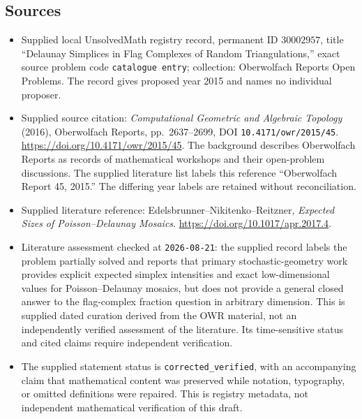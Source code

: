 \documentclass[11pt]{article}
\begin{document}
\subsection{Sources}
\begin{itemize}
\item Supplied local UnsolvedMath registry record, permanent ID \(30002957\), title ``Delaunay Simplices in Flag Complexes of Random Triangulations,'' exact source problem code \texttt{catalogue entry}; collection: Oberwolfach Reports Open Problems. The record gives proposed year 2015 and names no individual proposer.
\item Supplied source citation: \emph{Computational Geometric and Algebraic Topology} (2016), Oberwolfach Reports, pp.\ 2637--2699, DOI \texttt{10.4171/owr/2015/45}. \url{https://doi.org/10.4171/owr/2015/45}. The background describes Oberwolfach Reports as records of mathematical workshops and their open-problem discussions. The supplied literature list labels this reference ``Oberwolfach Report 45, 2015.'' The differing year labels are retained without reconciliation.
\item Supplied literature reference: Edelsbrunner--Nikitenko--Reitzner, \emph{Expected Sizes of Poisson--Delaunay Mosaics}. \url{https://doi.org/10.1017/apr.2017.4}.
\item Literature assessment checked at \texttt{2026-08-21}: the supplied record labels the problem partially solved and reports that primary stochastic-geometry work provides explicit expected simplex intensities and exact low-dimensional values for Poisson--Delaunay mosaics, but does not provide a general closed answer to the flag-complex fraction question in arbitrary dimension. This is supplied dated curation derived from the OWR material, not an independently verified assessment of the literature. Its time-sensitive status and cited claims require independent verification.
\item The supplied statement status is \texttt{corrected\_verified}, with an accompanying claim that mathematical content was preserved while notation, typography, or omitted definitions were repaired. This is registry metadata, not independent mathematical verification of this draft.
\end{itemize}
\end{document}

